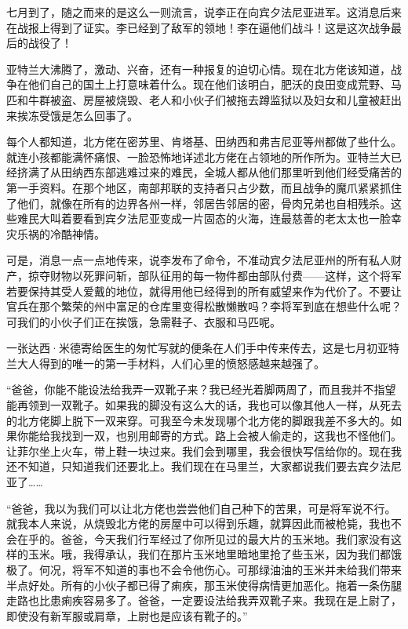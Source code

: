 \par 七月到了，随之而来的是这么一则流言，说李正在向宾夕法尼亚进军。这消息后来在战报上得到了证实。李已经到了敌军的领地！李在逼他们战斗！这是这次战争最后的战役了！
\par 亚特兰大沸腾了，激动、兴奋，还有一种报复的迫切心情。现在北方佬该知道，战争在他们自己的国土上打意味着什么。现在他们该明白，肥沃的良田变成荒野、马匹和牛群被盗、房屋被烧毁、老人和小伙子们被拖去蹲监狱以及妇女和儿童被赶出来挨冻受饿是怎么回事了。
\par 每个人都知道，北方佬在密苏里、肯塔基、田纳西和弗吉尼亚等州都做了些什么。就连小孩都能满怀痛恨、一脸恐怖地详述北方佬在占领地的所作所为。亚特兰大已经挤满了从田纳西东部逃难过来的难民，全城人都从他们那里听到他们经受痛苦的第一手资料。在那个地区，南部邦联的支持者只占少数，而且战争的魔爪紧紧抓住了他们，就像在所有的边界各州一样，邻居告邻居的密，骨肉兄弟也自相残杀。这些难民大叫着要看到宾夕法尼亚变成一片固态的火海，连最慈善的老太太也一脸幸灾乐祸的冷酷神情。
\par 可是，消息一点一点地传来，说李发布了命令，不准动宾夕法尼亚州的所有私人财产，掠夺财物以死罪问斩，部队征用的每一物件都由部队付费——这样，这个将军若要保持其受人爱戴的地位，就得用他已经得到的所有威望来作为代价了。不要让官兵在那个繁荣的州中富足的仓库里变得松散懒散吗？李将军到底在想些什么呢？可我们的小伙子们正在挨饿，急需鞋子、衣服和马匹呢。
\par 一张达西·米德寄给医生的匆忙写就的便条在人们手中传来传去，这是七月初亚特兰大人得到的唯一的第一手材料，人们心里的愤怒感越来越强了。
\par “爸爸，你能不能设法给我弄一双靴子来？我已经光着脚两周了，而且我并不指望能再领到一双靴子。如果我的脚没有这么大的话，我也可以像其他人一样，从死去的北方佬脚上脱下一双来穿。可我至今未发现哪个北方佬的脚跟我差不多大的。如果你能给我找到一双，也别用邮寄的方式。路上会被人偷走的，这我也不怪他们。让菲尔坐上火车，带上鞋一块过来。我们会到哪里，我会很快写信给你的。现在我还不知道，只知道我们还要北上。我们现在在马里兰，大家都说我们要去宾夕法尼亚了……
\par “爸爸，我以为我们可以让北方佬也尝尝他们自己种下的苦果，可是将军说不行。就我本人来说，从烧毁北方佬的房屋中可以得到乐趣，就算因此而被枪毙，我也不会在乎的。爸爸，今天我们行军经过了你所见过的最大片的玉米地。我们家没有这样的玉米。哦，我得承认，我们在那片玉米地里暗地里抢了些玉米，因为我们都饿极了。何况，将军不知道的事也不会令他伤心。可那绿油油的玉米并未给我们带来半点好处。所有的小伙子都已得了痢疾，那玉米使得病情更加恶化。拖着一条伤腿走路也比患痢疾容易多了。爸爸，一定要设法给我弄双靴子来。我现在是上尉了，即使没有新军服或肩章，上尉也是应该有靴子的。”
